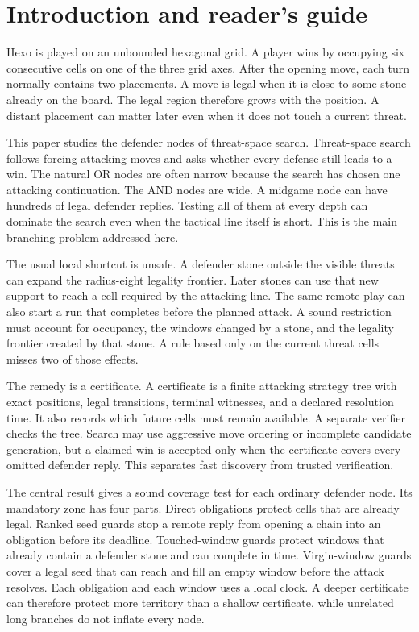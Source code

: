 \section{Introduction and reader's guide}
\label{sec:introduction}

Hexo is played on an unbounded hexagonal grid.  A player wins by occupying
six consecutive cells on one of the three grid axes.  After the opening move,
each turn normally contains two placements.  A move is legal when it is close
to some stone already on the board.  The legal region therefore grows with
the position.  A distant placement can matter later even when it does not
touch a current threat.

This paper studies the defender nodes of threat-space search.  Threat-space
search follows forcing attacking moves and asks whether every defense still
leads to a win.  The natural OR nodes are often narrow because the search has
chosen one attacking continuation.  The AND nodes are wide.  A midgame node
can have hundreds of legal defender replies.  Testing all of them at every
depth can dominate the search even when the tactical line itself is short.
This is the main branching problem addressed here.

The usual local shortcut is unsafe.  A defender stone outside the visible
threats can expand the radius-eight legality frontier.  Later stones can use
that new support to reach a cell required by the attacking line.  The same
remote play can also start a run that completes before the planned attack.
A sound restriction must account for occupancy, the windows changed by a
stone, and the legality frontier created by that stone.  A rule based only on
the current threat cells misses two of those effects.

The remedy is a certificate.  A certificate is a finite attacking strategy
tree with exact positions, legal transitions, terminal witnesses, and a
declared resolution time.  It also records which future cells must remain
available.  A separate verifier checks the tree.  Search may use aggressive
move ordering or incomplete candidate generation, but a claimed win is
accepted only when the certificate covers every omitted defender reply.
This separates fast discovery from trusted verification.

The central result gives a sound coverage test for each ordinary defender
node.  Its mandatory zone has four parts.  Direct obligations protect cells
that are already legal.  Ranked seed guards stop a remote reply from opening a
chain into an obligation before its deadline.  Touched-window guards protect
windows that already contain a defender stone and can complete in time.
Virgin-window guards cover a legal seed that can reach and fill an empty
window before the attack resolves.  Each obligation and each window uses a
local clock.  A deeper certificate can therefore protect more territory than
a shallow certificate, while unrelated long branches do not inflate every
node.

